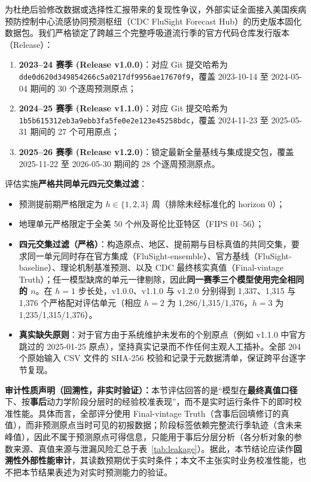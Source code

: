 \documentclass[11pt,a4paper]{article}
\theoremstyle{plain}
\theoremstyle{definition}
\begin{document}
为杜绝后验修改数据或选择性汇报带来的复现性争议，外部实证全面接入美国疾病预防控制中心流感协同预测枢纽（CDC FluSight Forecast Hub）的历史版本固化数据包\citep{flusight2024evaluation}。我们严格锁定了跨越三个完整呼吸道流行季的官方代码仓库发行版本（Release）：
\begin{enumerate}
\item \textbf{2023--24 赛季 (Release v1.0.0)}：对应 Git 提交哈希为 \nolinkurl{dde0d620d349854266c5a0217df9956ae17670f9}，覆盖 2023-10-14 至 2024-05-04 期间的 30 个逐周预测原点；
\item \textbf{2024--25 赛季 (Release v1.1.0)}：对应 Git 提交哈希为 \nolinkurl{1b5b615312eb3a9ebb3fa5fe0e2e123e45258bdc}，覆盖 2024-11-23 至 2025-05-31 期间的 27 个可用原点；
\item \textbf{2025--26 赛季 (Release v1.2.0)}：锁定最新全量基线与集成提交包，覆盖 2025-11-22 至 2026-05-30 期间的 28 个逐周预测原点。
\end{enumerate}

评估实施\textbf{严格共同单元四元交集过滤}：
\begin{itemize}
\item 预测提前期严格限定为 $h \in \{1, 2, 3\}$ 周（排除未经标准化的 horizon 0）；
\item 地理单元严格限定于全美 50 个州及哥伦比亚特区（FIPS 01--56）；
\item \textbf{四元交集过滤（严格）}：构造原点、地区、提前期与目标真值的共同交集，要求同一单元同时存在官方集成（FluSight-ensemble）、官方基线（FluSight-baseline）、理论机制基准预测、以及 CDC 最终核实真值（Final-vintage Truth）；任一模型缺席的单元一律剔除，因此\textbf{同一赛季三个模型使用完全相同的 $n$}。在 $h=1$ 步长处，v1.0.0、v1.1.0 与 v1.2.0 分别得到 1,337、1,315 与 1,376 个严格配对评估单元（相应 $h=2$ 为 1,286/1,315/1,376，$h=3$ 为 1,235/1,315/1,376）。
\item \textbf{真实缺失原则}：对于官方由于系统维护未发布的个别原点（例如 v1.1.0 中官方跳过的 2025-01-25 原点），坚持真实记录而不作任何主观人工插补。全部 204 个原始输入 CSV 文件的 SHA-256 校验和记录于元数据清单，保证跨平台逐字节复现。
\end{itemize}

\noindent\textbf{审计性质声明（回溯性，非实时验证）：}本节评估回答的是“模型在\textbf{最终真值口径}下、按\textbf{事后}动力学阶段分层时的经验校准表现”，而不是实时运行条件下的即时校准性能。具体而言，全部评分使用 Final-vintage Truth（含事后回填修订的真值），而非预测原点当时可见的初报数据；阶段标签依赖完整流行季轨迹（含未来峰值），因此不属于预测原点可得信息，只能用于事后分层分析（各分析对象的参数来源、真值来源与泄漏风险汇总于表~\ref{tab:leakage}）。据此，本节结论应读作\textbf{回溯性外部性能审计}，其读数预期优于实时条件；本文不主张实时业务校准性能，也不把本节结果表述为对实时预测能力的验证。
\end{document}
